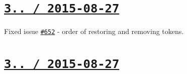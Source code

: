 \section*{\href{https://github.com/jakubpawlowicz/clean-css/compare/v3.4.0...v3.4.1}{\tt 3.. / 2015-\/08-\/27} }


\begin{DoxyItemize}
\item Fixed issue \href{https://github.com/jakubpawlowicz/clean-css/issues/652}{\tt \#652} -\/ order of restoring and removing tokens.
\end{DoxyItemize}

\section*{\href{https://github.com/jakubpawlowicz/clean-css/compare/v3.3.10...v3.4.0}{\tt 3.. / 2015-\/08-\/27} }


